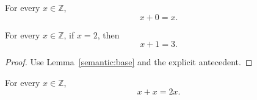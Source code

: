 \documentclass{article}
\begin{document}
\begin{lemma}\label{semantic:base}
For every $x\in\mathbb{Z}$, \[x+0=x.\]
\end{lemma}
\begin{theorem}\label{semantic:conditional}
For every
$x\in\mathbb{Z}$,
if
$x=2$,
then \[x+1=3.\]
\end{theorem}
\begin{proof}Use Lemma~\ref{semantic:base} and the explicit antecedent.\end{proof}
\begin{theorem}\label{semantic:independent}
For every $x\in\mathbb{Z}$, \[x+x=2x.\]
\end{theorem}
\end{document}
